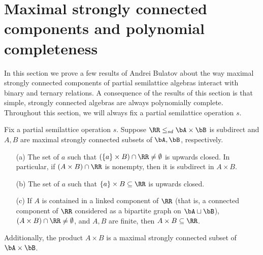 \section{Maximal strongly connected components and polynomial completeness}

In this section we prove a few results of Andrei Bulatov \cite{bulatov-bounded} about the way maximal strongly connected components of partial semilattice algebras interact with binary and ternary relations. A consequence of the results of this section is that simple, strongly connected algebras are always polynomially complete. Throughout this section, we will always fix a partial semilattice operation $s$.

\begin{thm}\label{strong-binary} Fix a partial semilattice operation $s$. Suppose $\RR \le_{sd} \bA \times \bB$ is subdirect and $A,B$ are maximal strongly connected subsets of $\bA, \bB$, respectively.
\begin{itemize}
\item[(a)] The set of $a$ such that $(\{a\} \times B) \cap \RR \ne \emptyset$ is upwards closed. In particular, if $(A\times B)\cap \RR$ is nonempty, then it is subdirect in $A\times B$.

\item[(b)] The set of $a$ such that $\{a\} \times B \subseteq \RR$ is upwards closed.

\item[(c)] If $A$ is contained in a linked component of $\RR$ (that is, a connected component of $\RR$ considered as a bipartite graph on $\bA \sqcup \bB$), $(A\times B) \cap \RR \ne \emptyset$, and $A,B$ are finite, then $A \times B \subseteq \RR$.
\end{itemize}
Additionally, the product $A\times B$ is a maximal strongly connected subset of $\bA \times \bB$.
\end{thm}
